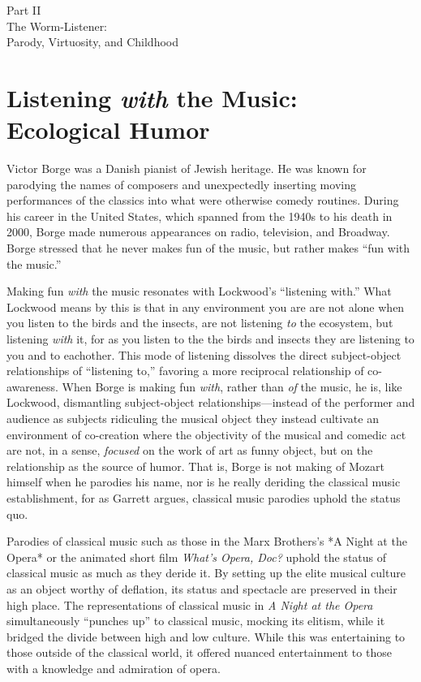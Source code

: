 \documentclass[12pt,letterpaper]{article}
\begin{document}
	\newpage
	\thispagestyle{empty}
	\vspace*{30pt}
	\begin{center}
	{\Huge Part II\\ 
	\Large The Worm-Listener:\\
	Parody, Virtuosity, and Childhood}
	\end{center}


	\newpage
	\section*{Listening \textit{with} the Music: Ecological Humor} 

	Victor Borge was a Danish pianist of Jewish heritage. He was known for 
	parodying the names of composers and unexpectedly inserting moving 
	performances of the classics into what were otherwise comedy 
	routines. During his career in the United 
	States, which spanned from the 1940s to his death in 2000, Borge
	made numerous appearances on radio, television, and Broadway. 
	Borge stressed that he never makes fun of the music, but rather makes 
	``fun with the music.'' \autocite[255]{Garrett}
 
	Making fun \textit{with} the music resonates with Lockwood's 
	``listening with.'' What Lockwood means by this is that in any 
	environment you are are not alone when you listen to the birds and the
	insects, are not listening \textit{to} the ecosystem, but listening 
	\textit{with} it, for as you listen to the the birds and insects they
	are listening to you and to eachother. This mode of listening dissolves
	 the direct 
	subject-object relationships of ``listening to,'' favoring a more 
	reciprocal relationship of co-awareness.  When Borge is making fun 
	\textit{with}, rather than \textit{of} the music, he is, like Lockwood, 
	dismantling subject-object relationships---instead of the performer and 
	audience as subjects ridiculing the musical object they instead 
	cultivate an environment of co-creation where the 
	objectivity of the musical and comedic act are not, in a sense, 
	\textit{focused} on the work of art as funny object, but on the 
	relationship as the source of humor. That is, Borge is not making of 
	Mozart himself when he parodies his name, nor is he really deriding the
 	classical music establishment, for as Garrett argues, classical music 
	parodies uphold the status quo. 

	Parodies of classical music such as those in the Marx Brothers's *A 
	Night at the Opera* or the animated short film \textit{What's Opera, 
	Doc?} uphold the status of classical music as much as they deride it. By
	setting up the elite musical culture as an object worthy of deflation, 
	its status and spectacle are preserved in their high 
	place.\autocite[252]{Garrett} The representations of classical music in
	\textit{A Night at the Opera} simultaneously ``punches up'' to classical
	music, mocking its elitism, while it bridged the divide between high and
	low culture. While this was entertaining to those outside of the 
	classical world, it offered nuanced entertainment to those with a 
	knowledge and admiration of opera.\autocite[251]{Garrett} 
\end{document}
